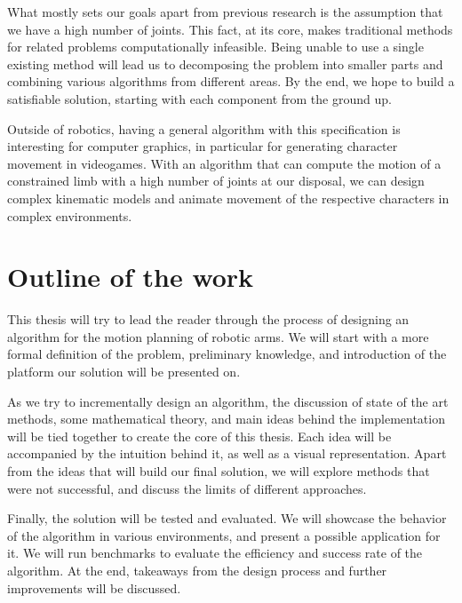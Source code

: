 What mostly sets our goals apart from previous research is the assumption that we have a high number of joints. This fact, at its core, makes traditional methods for related problems computationally infeasible.
Being unable to use a single existing method will lead us to decomposing the problem into smaller parts and combining various algorithms from different areas. By the end, we hope to build a satisfiable solution, starting with each component from the ground up.

Outside of robotics, having a general algorithm with this specification is interesting for computer graphics, in particular for generating character movement in videogames.
With an algorithm that can compute the motion of a constrained limb with a high number of joints at our disposal, we can design complex kinematic models and animate movement of the respective characters in complex environments.

\section{Outline of the work}

This thesis will try to lead the reader through the process of designing an algorithm for the motion planning of robotic arms. We will start with a more formal definition of the problem, preliminary knowledge, and introduction of the platform our solution will be presented on.

As we try to incrementally design an algorithm, the discussion of state of the art methods, some mathematical theory, and main ideas behind the implementation will be tied together to create the core of this thesis. Each idea will be accompanied by the intuition behind it, as well as a visual representation. Apart from the ideas that will build our final solution, we will explore methods that were not successful, and discuss the limits of different approaches.

Finally, the solution will be tested and evaluated. We will showcase the behavior of the algorithm in various environments, and present a possible application for it. We will run benchmarks to evaluate the efficiency and success rate of the algorithm. At the end, takeaways from the design process and further improvements will be discussed.
